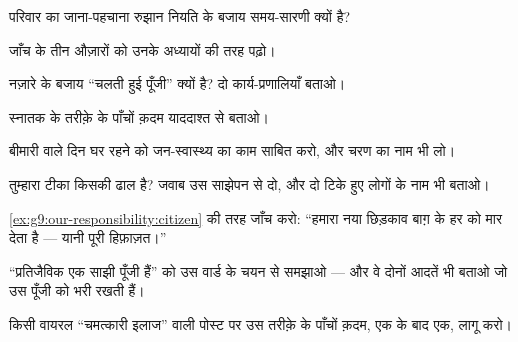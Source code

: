 \begin{exercise}[$\star$]\label{exo:g9:our-responsibility:3}
परिवार का जाना-पहचाना रुझान नियति के बजाय समय-सारणी क्यों है?
\end{exercise}

\begin{exercise}[$\star$]\label{exo:g9:our-responsibility:4}
जाँच के तीन औज़ारों को उनके अध्यायों की तरह पढ़ो।
\end{exercise}

\begin{exercise}[$\star$]\label{exo:g9:our-responsibility:5}
 नज़ारे के बजाय ``चलती हुई पूँजी'' क्यों है? दो
कार्य-प्रणालियाँ बताओ।
\end{exercise}

\begin{exercise}[$\star$]\label{exo:g9:our-responsibility:6}
स्नातक के तरीक़े के पाँचों क़दम याददाश्त से बताओ।
\end{exercise}

\begin{exercise}[$\star\star$]\label{exo:g9:our-responsibility:7}
बीमारी वाले दिन घर रहने को जन-स्वास्थ्य का काम साबित करो, और चरण का नाम
भी लो।
\end{exercise}

\begin{exercise}[$\star\star$]\label{exo:g9:our-responsibility:8}
तुम्हारा टीका किसकी ढाल है? जवाब उस साझेपन से दो, और दो टिके हुए लोगों
के नाम भी बताओ।
\end{exercise}

\begin{exercise}[$\star\star$]\label{exo:g9:our-responsibility:9}
\cref{ex:g9:our-responsibility:citizen} की तरह जाँच करो: ``हमारा नया
छिड़काव बाग़ के हर  को मार देता है --- यानी पूरी हिफ़ाज़त।''
\end{exercise}

\begin{exercise}[$\star\star$]\label{exo:g9:our-responsibility:10}
``प्रतिजैविक एक साझी पूँजी हैं'' को उस वार्ड के चयन से समझाओ --- और वे
दोनों आदतें भी बताओ जो उस पूँजी को भरी रखती हैं।
\end{exercise}

\begin{exercise}[$\star\star$]\label{exo:g9:our-responsibility:11}
किसी वायरल ``चमत्कारी इलाज'' वाली पोस्ट पर उस तरीक़े के पाँचों क़दम, एक
के बाद एक, लागू करो।
\end{exercise}

